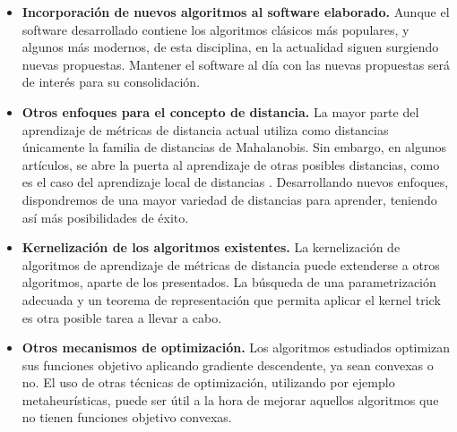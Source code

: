 \begin{itemize}
    \item \textbf{Incorporación de nuevos algoritmos al software elaborado.} Aunque el software desarrollado contiene los algoritmos clásicos más populares, y algunos más modernos, de esta disciplina, en la actualidad siguen surgiendo nuevas propuestas. Mantener el software al día con las nuevas propuestas será de interés para su consolidación.
    \item \textbf{Otros enfoques para el concepto de distancia.} La mayor parte del aprendizaje de métricas de distancia actual utiliza como distancias únicamente la familia de distancias de Mahalanobis. Sin embargo, en algunos artículos, se abre la puerta al aprendizaje de otras posibles distancias, como es el caso del aprendizaje local de distancias \cite{lmnn}. Desarrollando nuevos enfoques, dispondremos de una mayor variedad de distancias para aprender, teniendo así más posibilidades de éxito.
    \item \textbf{Kernelización de los algoritmos existentes.} La kernelización de algoritmos de aprendizaje de métricas de distancia puede extenderse a otros algoritmos, aparte de los presentados. La búsqueda de una parametrización adecuada y un teorema de representación que permita aplicar el kernel trick es otra posible tarea a llevar a cabo.
    \item \textbf{Otros mecanismos de optimización.} Los algoritmos estudiados optimizan sus funciones objetivo aplicando gradiente descendente, ya sean convexas o no. El uso de otras técnicas de optimización, utilizando por ejemplo metaheurísticas, puede ser útil a la hora de mejorar aquellos algoritmos que no tienen funciones objetivo convexas.
\end{itemize}
